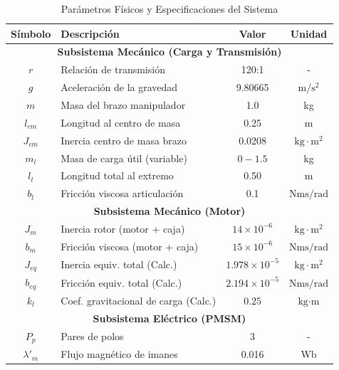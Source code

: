 \documentclass[12pt, a4paper,journal, onecolumn, compsoc]{IEEEtran}
\begin{document}
\begin{table}[htbp]
    \caption{Parámetros Físicos y Especificaciones del Sistema}
    \centering
    \renewcommand{\arraystretch}{1.2} %
    \begin{tabular}{|c|l|c|c|}
        \hline
        \textbf{Símbolo} & \textbf{Descripción} & \textbf{Valor} & \textbf{Unidad} \\
        \hline
        \multicolumn{4}{|c|}{\textbf{Subsistema Mecánico (Carga y Transmisión)}} \\
        \hline
        $r$ & Relación de transmisión & 120:1 & - \\
        $g$ & Aceleración de la gravedad & 9.80665 & $\text{m}/\text{s}^2$ \\
        $m$ & Masa del brazo manipulador & 1.0 & kg \\
        $l_{cm}$ & Longitud al centro de masa & 0.25 & m \\
        $J_{cm}$ & Inercia centro de masa brazo & 0.0208 & $\text{kg}\cdot\text{m}^2$ \\
        $m_l$ & Masa de carga útil (variable) & $0 - 1.5$ & kg \\
        $l_{l}$ & Longitud total al extremo & 0.50 & m \\
        $b_{l}$ & Fricción viscosa articulación & 0.1 & $\text{Nms}/\text{rad}$ \\
        \hline
        \multicolumn{4}{|c|}{\textbf{Subsistema Mecánico (Motor)}} \\
        \hline
        $J_m$ & Inercia rotor (motor + caja) & $14 \times 10^{-6}$ & $\text{kg}\cdot\text{m}^2$ \\
        $b_m$ & Fricción viscosa (motor + caja) & $15 \times 10^{-6}$ & $\text{Nms}/\text{rad}$ \\
        $J_{eq}$ & Inercia equiv. total (Calc.) & $1.978 \times 10^{-5}$ & $\text{kg}\cdot\text{m}^2$ \\
        $b_{eq}$ & Fricción equiv. total (Calc.) & $2.194 \times 10^{-5}$ & $\text{Nms}/\text{rad}$ \\
        $k_l$ & Coef. gravitacional de carga (Calc.) & $0.25$ & $\text{kg}\cdot\text{m}$ \\
        \hline
        \multicolumn{4}{|c|}{\textbf{Subsistema Eléctrico (PMSM)}} \\
        \hline
        $P_p$ & Pares de polos & 3 & - \\
        $\lambda'_m$ & Flujo magnético de imanes & 0.016 & Wb \\

\end{tabular}
\end{table}
\end{document}
